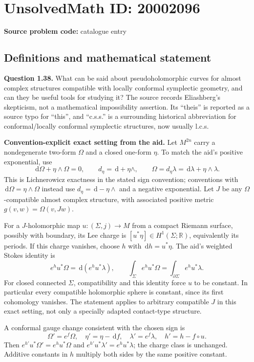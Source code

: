 \documentclass[11pt]{article}
\newcommand{\R}{\mathbb{R}}
\newcommand{\dd}{\,\mathrm{d}}
\begin{document}
\section*{UnsolvedMath ID: 20002096}
\textbf{Source problem code:} catalogue entry
\subsection{Definitions and mathematical statement}
\textbf{Question 1.38.} What can be said about pseudoholomorphic curves for almost complex structures compatible with locally conformal symplectic geometry, and can they be useful tools for studying it? The source records Eliashberg's skepticism, not a mathematical impossibility assertion. Its ``theis'' is reported as a source typo for ``this'', and ``c.s.s.'' is a surrounding historical abbreviation for conformal/locally conformal symplectic structures, now usually l.c.s.

\textbf{Convention-explicit exact setting from the aid.} Let $M^{2n}$ carry a nondegenerate two-form $\Omega$ and a closed one-form $\eta$. To match the aid's positive exponential, use
\[
 \dd\Omega+\eta\wedge\Omega=0,\qquad
 d_\eta=\dd+\eta\wedge,\qquad
 \Omega=d_\eta\lambda=\dd\lambda+\eta\wedge\lambda.
\]
This is Lichnerowicz exactness in the stated sign convention; conventions with $\dd\Omega=\eta\wedge\Omega$ instead use $d_\eta=\dd-\eta\wedge$ and a negative exponential. Let $J$ be any $\Omega$-compatible almost complex structure, with associated positive metric $g(v,w)=\Omega(v,Jw)$.

For a $J$-holomorphic map $u:(\Sigma,j)\to M$ from a compact Riemann surface, possibly with boundary, its Lee charge is $[u^*\eta]\in H^1(\Sigma;\R)$, equivalently its periods. If this charge vanishes, choose $h$ with $\dd h=u^*\eta$. The aid's weighted Stokes identity is
\[
 e^h u^*\Omega=\dd(e^h u^*\lambda),\qquad
 \int_\Sigma e^h u^*\Omega
       =\int_{\partial\Sigma}e^h u^*\lambda.
\]
For closed connected $\Sigma$, compatibility and this identity force $u$ to be constant. In particular every compatible holomorphic sphere is constant, since its first cohomology vanishes. The statement applies to arbitrary compatible $J$ in this exact setting, not only a specially adapted contact-type structure.

A conformal gauge change consistent with the chosen sign is
\[
 \Omega'=e^f\Omega,\quad\eta'=\eta-\dd f,\quad
 \lambda'=e^f\lambda,\quad h'=h-f\circ u.
\]
Then $e^{h'}u^*\Omega'=e^hu^*\Omega$ and $e^{h'}u^*\lambda'=e^hu^*\lambda$; the charge class is unchanged. Additive constants in $h$ multiply both sides by the same positive constant.
\end{document}
